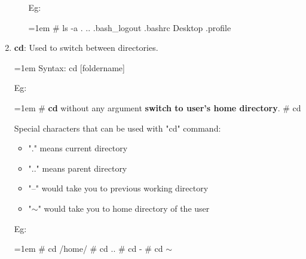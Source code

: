 \begin{flushleft}
\begin{enumerate}
\begin{itemize}
			Eg:
			\begin{tcolorbox}[breakable,notitle,boxrule=-0pt,colback=black,colframe=black]
				\color{green}
				\font=1em
				\# ls -a
				\color{white}
				\newline
				.  ..  .bash\_logout  .bashrc  Desktop  .profile
				\font=4pt
			\end{tcolorbox}
		\end{itemize}
		\bigskip
		\bigskip

		\newpage
		\item \textbf{cd}: Used to switch between directories.
		\bigskip
		\begin{tcolorbox}[breakable,notitle,boxrule=1pt,colback=pink,colframe=pink]
			\color{black}
			\font=1em
			Syntax:  cd [foldername]
			\font=4pt
		\end{tcolorbox}
		Eg:
		\begin{tcolorbox}[breakable,notitle,boxrule=-0pt,colback=black,colframe=black]
			\font=1em
			\color{yellow}
			\# \textbf{cd} without any argument \textbf{switch to user's home directory}.
			\newline
			\color{green}
			\# cd
			\font=4pt
		\end{tcolorbox}
		Special characters that can be used with "cd" command:
		\begin{itemize}
			\item "." means current directory
			\item ".." means parent directory
			\item "–" would take you to previous working directory
			\item {"$\sim$"} would take you to home directory of the user
		\end{itemize}
		Eg:
		\begin{tcolorbox}[breakable,notitle,boxrule=-0pt,colback=black,colframe=black]
			\color{green}
			\font=1em
			\# cd /home/
			\newline
			\# cd ..
			\newline
			\# cd -
			\newline
			\# cd {$\sim$}
			\font=4pt
		\end{tcolorbox}


\end{enumerate}
\end{flushleft}
